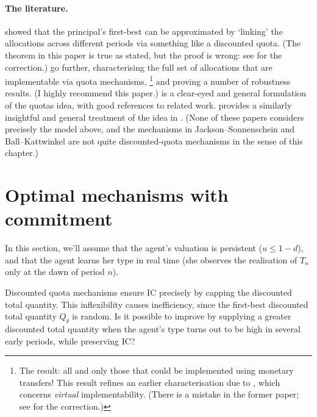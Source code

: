 \paragraph{The literature.}
\textcite{JacksonSonnenschein2007} showed that the principal's first-best can be approximated by `linking' the allocations across different periods via something like a discounted quota.
(The theorem in this paper is true as stated, but the proof is wrong: see \textcite{BallJacksonKattwinkel2022} for the correction.)
\textcite{BallKattwinkel2023} go further, characterising the full set of allocations that are implementable via quota mechanisms,%
	\footnote{The result: all and only those that could be implemented using monetary transfers! This result refines an earlier characterisation due to \textcite{MatsushimaMiyazakiYagi2010,Ishii2016}, which concerns \emph{virtual} implementability. (There is a mistake in the former paper; see \textcite{BallKattwinkel2023comment} for the correction.)}
and proving a number of robustness results. (I highly recommend this paper.)
\textcite{Frankel2016jet} is a clear-eyed and general formulation of the quotas idea, with good references to related work.
\textcite{Frankel2016aej} provides a similarly insightful and general treatment of the idea in .
(None of these papers considers precisely the model above,
and the mechanisms in Jackson--Sonnenschein and Ball--Kattwinkel are not quite discounted-quota mechanisms in the sense of this chapter.)



\section{Optimal mechanisms with commitment}
\label{sec:ch3:guohorner}

In this section, we'll assume that the agent's valuation is persistent ($u \leq 1-d$),
and that the agent learns her type in real time (she observes the realisation of $T_n$ only at the dawn of period $n$).

Discounted quota mechanisms ensure IC
precisely by capping the discounted total quantity.
This inflexibility causes inefficiency, since the first-best discounted total quantity $Q_\delta$ is random.
Is it possible to improve by supplying a greater discounted total quantity when the agent's type turns out to be high in several early periods, while preserving IC?

